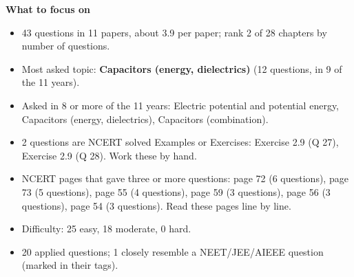 \begin{minipage}[t]{0.63\linewidth}{\small\textbf{\color{crimson}What to focus on}\par\smallskip
\begin{itemize}[leftmargin=1.1em,itemsep=1pt,topsep=0pt]
\item 43 questions in 11 papers, about 3.9 per paper; rank 2 of 28 chapters by number of questions.
\item Most asked topic: \textbf{Capacitors (energy, dielectrics)} (12 questions, in 9 of the 11 years).
\item Asked in 8 or more of the 11 years: Electric potential and potential energy, Capacitors (energy, dielectrics), Capacitors (combination).
\item 2 questions are NCERT solved Examples or Exercises: Exercise 2.9 (Q 27), Exercise 2.9 (Q 28). Work these by hand.
\item NCERT pages that gave three or more questions: page 72 (6 questions), page 73 (5 questions), page 55 (4 questions), page 59 (3 questions), page 56 (3 questions), page 54 (3 questions). Read these pages line by line.
\item Difficulty: 25 easy, 18 moderate, 0 hard.
\item 20 applied questions; 1 closely resemble a NEET/JEE/AIEEE question (marked in their tags).
\end{itemize}}\end{minipage}\par
{}
